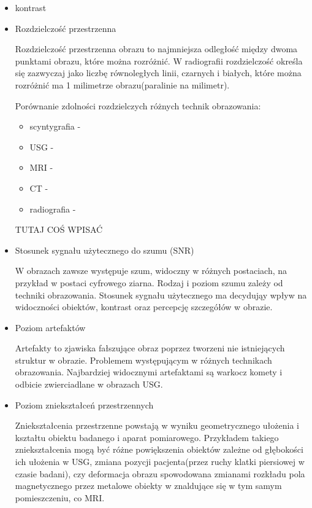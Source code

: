 \begin{itemize}
    \item kontrast

    \item Rozdzielczość przestrzenna

    Rozdzielczość przestrzenna obrazu to najmniejsza odległość między dwoma punktami obrazu, które można rozróżnić.
    W radiografii rozdzielczość określa się zazwyczaj jako liczbę równoległych linii, czarnych i białych, które można rozróżnić ma 1 milimetrze obrazu(paralinie na milimetr).

    Porównanie zdolności rozdzielczych różnych technik obrazowania:
    \begin{itemize}
        \item scyntygrafia - 
        \item USG - 
        \item MRI -
        \item CT -
        \item radiografia -
    \end{itemize}
    TUTAJ COŚ WPISAĆ

    \item Stosunek sygnału użytecznego do szumu (SNR)

    W obrazach zawsze występuje szum, widoczny w różnych postaciach, na przykład w postaci cyfrowego ziarna.
    Rodzaj i poziom szumu zależy od techniki obrazowania.
    Stosunek sygnału użytecznego ma decydująy wpływ na widoczności obiektów, kontrast oraz percepcję szczegółów w obrazie.

    \item Poziom artefaktów
    
    Artefakty to zjawiska fałszujące obraz poprzez tworzeni nie istniejących struktur w obrazie.
    Problemem występującym w różnych technikach obrazowania.
    Najbardziej widocznymi artefaktami są warkocz komety i odbicie zwierciadlane w obrazach USG.

    \item Poziom zniekształceń przestrzennych
    
    Zniekształcenia przestrzenne powstają w wyniku geometrycznego ułożenia i kształtu obiektu badanego i aparat pomiarowego.
    Przykładem takiego zniekształcenia mogą być różne powiększenia obiektów zależne od głębokości ich ułożenia w USG, zmiana pozycji pacjenta(przez ruchy klatki piersiowej w czasie badani), czy deformacja obrazu spowodowana zmianami rozkładu pola magnetycznego przez metalowe obiekty w znaldujące się w tym samym pomieszczeniu, co MRI.

\end{itemize}

